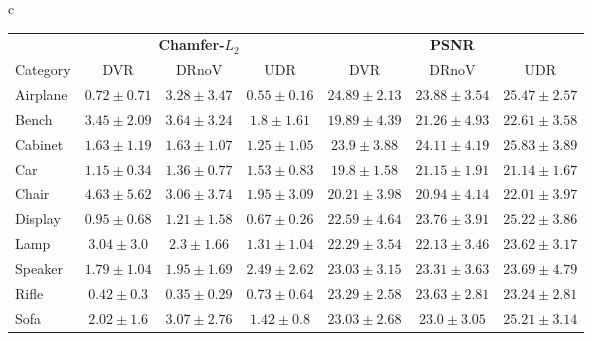 \documentclass[runningheads]{llncs}
\begin{document}
\begin{table}[t]
    \hspace{-20pt}
    \setlength\tabcolsep{8pt} %
    \begin{tabular}{c}
        \begin{adjustbox}{max width=\textwidth}
        \renewcommand{\arraystretch}{1.1}
        \begin{tabular}[t]{l||ccc|ccc}
            \toprule
             &
            \multicolumn{3}{c|}{\textbf{Chamfer-$L_2$}} & 
            \multicolumn{3}{c}{\textbf{PSNR}} \\
        Category & DVR \cite{niemeyer2019differentiable} & DRnoV & UDR &  DVR \cite{niemeyer2019differentiable} & DRnoV & UDR \\
         \midrule 
        Airplane & $0.72\pm0.71$ & $3.28\pm3.47$ & $\mathbf{0.55}\pm0.16$ &
        $24.89\pm2.13$ & $23.88\pm3.54$ & $\mathbf{25.47}\pm2.57$ \\
        Bench & $3.45\pm2.09$ & $3.64\pm3.24$ & $\mathbf{1.8}\pm1.61$ &
        $19.89\pm4.39$ & $21.26\pm4.93$ & $\mathbf{22.61}\pm3.58$ \\
        Cabinet &$1.63\pm1.19$ & $1.63\pm1.07$ & $\mathbf{1.25}\pm1.05$ &
        $23.9\pm3.88$ & $24.11\pm4.19$ & $\mathbf{25.83}\pm3.89$ \\
        Car & $\mathbf{1.15}\pm0.34$ & $1.36\pm0.77$ & $1.53\pm0.83$ & 
        $19.8\pm1.58$ & $\mathbf{21.15}\pm1.91$ & $21.14\pm1.67$ \\
        Chair & $4.63\pm5.62$ & $3.06\pm3.74$ & $\mathbf{1.95}\pm3.09$ &
        $20.21\pm3.98$ & $20.94\pm4.14$ & $\mathbf{22.01}\pm3.97$ \\
        Display & $0.95\pm0.68$ & $1.21\pm1.58$ &$\mathbf{0.67}\pm0.26$ & 
        $22.59\pm4.64$ & $23.76\pm3.91$ & $\mathbf{25.22}\pm3.86$ \\
        Lamp & $3.04\pm3.0$ & $2.3\pm1.66$ & $\mathbf{1.31}\pm1.04$ &
        $22.29\pm3.54$ & $22.13\pm3.46$ & $\mathbf{23.62}\pm3.17$ \\
        Speaker & $\mathbf{1.79}\pm1.04$ & $1.95\pm1.69$ & $2.49\pm2.62$ &
        $\mathbf{23.03}\pm3.15$ & $23.31\pm3.63$ & $23.69\pm4.79$ \\
        Rifle & $0.42\pm0.3$ & $\mathbf{0.35}\pm0.29$ & $0.73\pm0.64$ & 
        $23.29\pm2.58$ & $\mathbf{23.63}\pm2.81$ & $23.24\pm2.81$ \\
        Sofa & $2.02\pm1.6$ & $3.07\pm2.76$ & $\mathbf{1.42}\pm0.8$ &
        $23.03\pm2.68$ & $23.0\pm3.05$ & $\mathbf{25.21}\pm3.14$ \\

\end{tabular}
\end{adjustbox}
\end{tabular}
\end{table}
\end{document}
